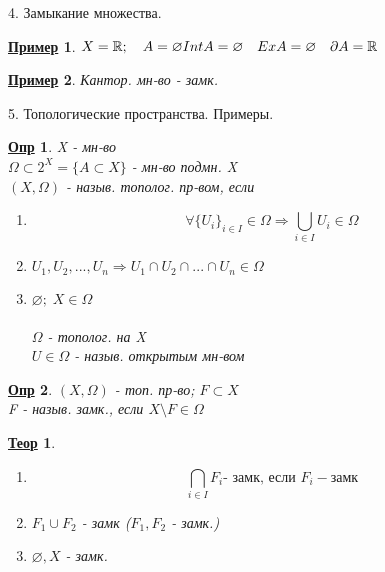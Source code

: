 \documentclass[12pt, fleqn]{article}
\newenvironment{question}[1]{\hspace*{-4em} #1}{\newpage}
\newcommand{\R}{\mathbb{R}}
\theoremstyle{nonumbermarginbreak}
\newtheorem{theorem}{\hspace*{-2em}\underline{\bfseries Теор}}[section]
\newtheorem{definition}{\hspace*{-2em}\underline{\bfseries Опр}}[section]
\newtheorem{example}{\hspace*{-2em}\underline{\bfseries Пример}}[section]
\begin{document}
\begin{question}{4. Замыкание множества.}
        \begin{example} 
            $X = \R; \quad A = \varnothing \\
            Int A = \varnothing \quad Ex A = \varnothing \quad \partial A = \R$
        \end{example}

        \begin{example} 
            Кантор. мн-во - замк. \\
            
        \end{example}
    \end{question}

    \begin{question}{5. Топологические пространства. Примеры.}
        \begin{definition} 
            X - мн-во\\
            $\Omega \subset 2^X = \{A \subset X\}$ - мн-во подмн. X\\
            $(X, \Omega)$ - назыв. тополог. пр-вом, если\\
            \begin{enumerate}
                \item \[\forall \{U_i\}_{i \in I} \in \Omega \Rightarrow\bigcup_{i \in I} U_i \in \Omega\]        
                \item $U_1, U_2, ..., U_n \Rightarrow U_1 \cap U_2 \cap ... \cap U_n \in \Omega$
                \item $\varnothing; \; X \in \Omega$\\\\
                $\Omega$ - тополог. на X\\
                $U \in \Omega$ - назыв. открытым мн-вом
            \end{enumerate}
        \end{definition}

        \begin{definition} 
            $(X, \Omega)$ - топ. пр-во; $F \subset X$ \\
            F - назыв. замк., если $X \setminus F \in \Omega$
        \end{definition}

        \begin{theorem} 
            \begin{enumerate}
                \item \[\bigcap_{i \in I} F_i \text{- замк, если } F_i - \text{замк}\]
                \item $F_1 \cup F_2$ - замк ($F_1, F_2$ - замк.)
                \item $\varnothing, X$ - замк.
            \end{enumerate}
        \end{theorem}


\end{question}
\end{document}

